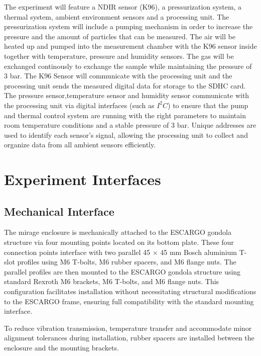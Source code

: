 \documentclass[
  a4paper,
  11pt,
  openany,
  parskip,
  toc=totoc,
  listof=totoc,
  bibliography=totoc
]{scrreprt}
\begin{document}
The experiment will feature a NDIR sensor (K96), a pressurization system, a thermal system, ambient environment sensors and a processing unit. 
The pressurization system will include a pumping mechanism in order to increase the pressure and the amount of particles that can be measured. The air will be heated up and pumped into the measurement chamber with the K96 sensor inside together with temperature, pressure and humidity sensors. The gas will be exchanged continously to exchange the sample while maintaining the pressure of 3 bar. 
The K96 Sensor will communicate with the processing unit and the processing unit sends the measured digital data for storage to the SDHC card.
The pressure sensor,temperature sensor and humidity sensor communicate with the processing unit via digital interfaces (such as $I^2C$) to ensure that the pump and thermal control system are running with the right parameters to maintain room temperature conditions and a stable pressure of 3 bar. Unique addresses are used to identify each sensor's signal, allowing the processing unit to collect and organize data from all ambient sensors efficiently.

\section{Experiment Interfaces}

\subsection{Mechanical Interface}\label{mechanical_interface}

The \gls{mirage} enclosure is mechanically attached to the ESCARGO gondola structure via four mounting points located on its bottom plate. These four connection points interface with two parallel 45 $\times$ 45 mm Bosch aluminium T-slot profiles using M6 T-bolts, M6 rubber spacers, and M6 flange nuts. The parallel profiles are then mounted to the ESCARGO gondola structure using standard Rexroth M6 brackets, M6 T-bolts, and M6 flange nuts. This configuration facilitates installation without necessitating structural modifications to the ESCARGO frame, ensuring full compatibility with the standard mounting interface.

To reduce vibration transmission, temperature transfer and accommodate minor alignment tolerances during installation, rubber spacers are installed between the enclosure and the mounting brackets.
\end{document}
